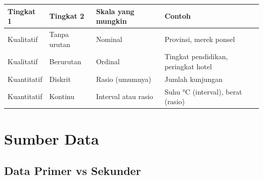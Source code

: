 \documentclass[
  indonesian,
  letterpaper,
]{book}
\newcounter{none} %
\begin{document}
{\def\LTcaptype{none} %
\begin{longtable}[]{@{}
  >{\raggedright\arraybackslash}p{}
  >{\raggedright\arraybackslash}p{}
  >{\raggedright\arraybackslash}p{}
  >{\raggedright\arraybackslash}p{}@{}}
\toprule\noalign{}
\begin{minipage}[b]{\linewidth}\raggedright
Tingkat 1
\end{minipage} & \begin{minipage}[b]{\linewidth}\raggedright
Tingkat 2
\end{minipage} & \begin{minipage}[b]{\linewidth}\raggedright
Skala yang mungkin
\end{minipage} & \begin{minipage}[b]{\linewidth}\raggedright
Contoh
\end{minipage} \\
\midrule\noalign{}
\endhead
\bottomrule\noalign{}
\endlastfoot
Kualitatif & Tanpa urutan & Nominal & Provinsi, merek ponsel \\
Kualitatif & Berurutan & Ordinal & Tingkat pendidikan, peringkat
hotel \\
Kuantitatif & Diskrit & Rasio (umumnya) & Jumlah kunjungan \\
Kuantitatif & Kontinu & Interval atau rasio & Suhu °C (interval), berat
(rasio) \\
\end{longtable}
}

\section{Sumber Data}\label{sumber-data}

\subsection{Data Primer vs Sekunder}\label{data-primer-vs-sekunder}
\end{document}
